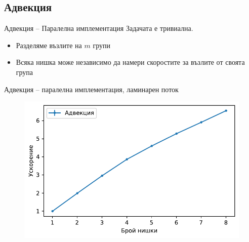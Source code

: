 \documentclass{beamer}
\begin{document}
\subsection{Адвекция}
\begin{frame}{Адвекция -- Паралелна имплементация}
	Задачата е тривиална.
	\begin{itemize}
		\item Разделяме възлите на $m$ групи
		\item Всяка нишка може независимо да намери скоростите за възлите от своята група
	\end{itemize}
\end{frame}
\begin{frame}{Адвекция -- паралелна имплементация, ламинарен поток}
        \begin{figure}[htbp]
            \centering
            \includegraphics[width=\linewidth]{../Figures/BG/LaminarAdvectionSpeedUpC2.pdf} 
        \end{figure}
\end{frame}
\end{document}
